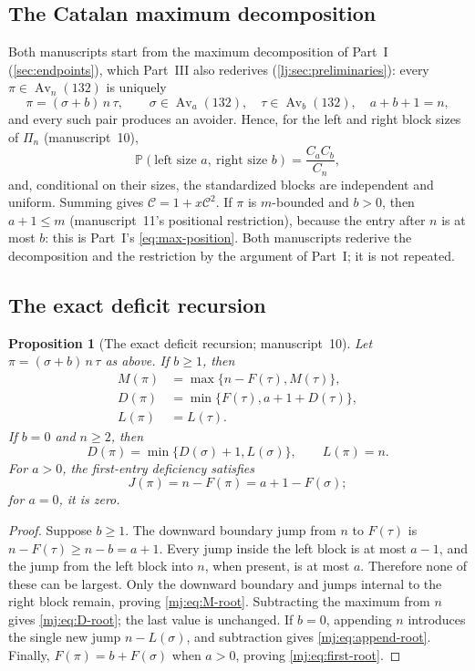 \documentclass[11pt,a4paper]{article}
\newtheorem{proposition}[proposition]{Proposition}
\theoremstyle{definition}\newaliascnt{definition}{theorem}
\theoremstyle{remark}\newaliascnt{remark}{theorem}
\newcommand{\Av}{\operatorname{Av}}
\newcommand{\Cat}{\mathcal C}
\newcommand{\ljP}{\mathbb P}
\begin{document}
\subsection{The Catalan maximum decomposition}
Both manuscripts start from the maximum decomposition of Part~I
(\cref{sec:endpoints}), which Part~III also rederives
(\cref{lj:sec:preliminaries}): every $\pi\in\Av_n(132)$ is uniquely
\[
 \pi=(\sigma+b)\,n\,\tau,
 \qquad \sigma\in\Av_a(132),\quad\tau\in\Av_b(132),\quad a+b+1=n,
\]
and every such pair produces an avoider. Hence, for the left and right block
sizes of $\Pi_n$ (manuscript~10),
\begin{equation}
 \ljP(\text{left size }a,\ \text{right size }b)=\frac{C_aC_b}{C_n},
 \label{mj:eq:split-weight}
\end{equation}
and, conditional on their sizes, the standardized blocks are independent and
uniform. Summing gives $\Cat=1+x\Cat^2$. If $\pi$ is $m$-bounded and $b>0$,
then $a+1\le m$ (manuscript~11's positional restriction), because the entry
after $n$ is at most $b$: this is Part~I's \eqref{eq:max-position}. Both
manuscripts rederive the decomposition and the restriction by the argument of
Part~I; it is not repeated.

\subsection{The exact deficit recursion}
\begin{proposition}[The exact deficit recursion; manuscript~10]
\label{mj:prop:root}
Let $\pi=(\sigma+b)\,n\,\tau$ as above. If $b\ge1$, then
\begin{align}
 M(\pi)&=\max\{n-F(\tau),M(\tau)\},\label{mj:eq:M-root}\\
 D(\pi)&=\min\{F(\tau),a+1+D(\tau)\},\label{mj:eq:D-root}\\
 L(\pi)&=L(\tau).\label{mj:eq:L-root}
\end{align}
If $b=0$ and $n\ge2$, then
\begin{equation}
 D(\pi)=\min\{D(\sigma)+1,L(\sigma)\},
 \qquad L(\pi)=n.
 \label{mj:eq:append-root}
\end{equation}
For $a>0$, the first-entry deficiency satisfies
\begin{equation}
 J(\pi)=n-F(\pi)=a+1-F(\sigma);
 \label{mj:eq:first-root}
\end{equation}
for $a=0$, it is zero.
\end{proposition}
\begin{proof}
Suppose $b\ge1$. The downward boundary jump from $n$ to $F(\tau)$ is
$n-F(\tau)\ge n-b=a+1$. Every jump inside the left block is at most $a-1$,
and the jump from the left block into $n$, when present, is at most $a$.
Therefore none of these can be largest. Only the downward boundary and
jumps internal to the right block remain, proving \eqref{mj:eq:M-root}.
Subtracting the maximum from $n$ gives \eqref{mj:eq:D-root}; the last value
is unchanged. If $b=0$, appending $n$ introduces the single new jump
$n-L(\sigma)$, and subtraction gives \eqref{mj:eq:append-root}. Finally,
$F(\pi)=b+F(\sigma)$ when $a>0$, proving \eqref{mj:eq:first-root}.
\end{proof}
\end{document}
